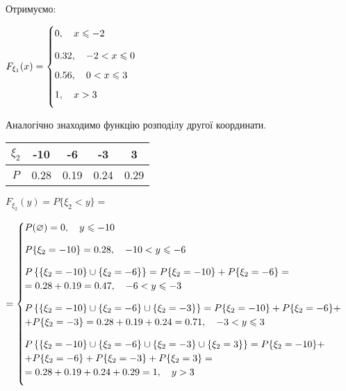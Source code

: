 \documentclass[a4paper, 20pt, titlepage]{article}
\begin{document}
\newpage{}

\hspace{-6mm} Отримуємо:

\begin{center}
$
F_{\xi_1}(x) = 
\begin{cases}
	\vspace{3mm}
	0, \quad x \leqslant -2 \\ \vspace{2mm}
	0.32, \quad -2 < x \leqslant 0 \\ \vspace{2mm} 
	0.56, \quad 0 < x \leqslant 3  \\ \vspace{2mm}
	1, \quad x > 3
\end{cases}
$
\end{center}

\hspace{-6mm} Аналогічно знаходимо функцію розподілу другої координати.
\vspace{4mm}
\begin{center}
\begin{tabular}{|c|c|c|c|c|}
\hline 
$\xi_2$ & -10& -6 & -3 & 3 \\ \hline
$P$ & 0.28 & 0.19 & 0.24 & 0.29\\ \hline 
\end{tabular}
\end{center}

\vspace{4mm}

$F_{\xi_2}(y) = P\{\xi_2 < y\} = $ 

\begin{flushleft}
$
 =\nolinebreak 
	\begin{cases}
		\vspace{3mm}
		P(\varnothing) = 0, \quad y \leqslant -10 \\ \vspace{3mm}
		P\{\xi_2 = -10\} = 0.28,  \quad -10 < y \leqslant -6 \\ 
		P\left\{\{\xi_2 = -10\} \cup \{\xi_2 = -6\}\right\} = P\{\xi_2 = -10\} + P\{\xi_2  = -6\} = \\ \vspace{3mm}
		= 0.28 + 0.19 = 0.47, \quad -6 < y \leqslant -3 \\  
		P\left\{\{\xi_2 = -10\} \cup \{\xi_2 = -6\} \cup \{\xi_2 = -3\}\right\} = P\{\xi_2 = -10\} + P\{\xi_2  = -6\} + \\ \vspace{3mm} + P\{\xi_2  = -3\} 
		= 0.28 + 0.19 + 0.24 = 0.71, \quad -3 < y \leqslant 3 \\ 
		P\left\{\{\xi_2 = -10\} \cup \{\xi_2 = -6\} \cup \{\xi_2 = -3\} \cup \{\xi_2 = 3\}\right\} = P\{\xi_2 = -10\} +  \\ +   P\{\xi_2  = -6\} +
                P\{\xi_2  = -3\} + P\{\xi_2 = 3\}=  \\ \vspace{3mm}   = 0.28 + 0.19 + 0.24 + 0.29 = 1, \quad y > 3
	\end{cases}
$
\end{flushleft}
\end{document}
